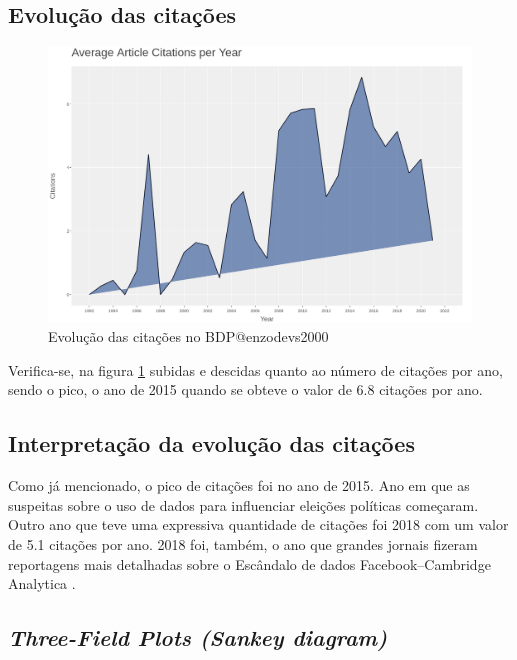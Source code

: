 \subsection{Evolução das citações}

\begin{figure}[H]
    \centering
    \includegraphics[width=1\textwidth]{experiments/enzodevs2000/AnaliseBibliometrica/BigDataInPolicy/Figures/Graficos/citations-evolution.png}
    \caption{Evolução das citações no \dataset BDP@enzodevs2000}
    \label{fig:enzodevs2000:BDP:evol_citation}
\end{figure}

Verifica-se, na figura \ref{fig:enzodevs2000:BDP:evol_citation} subidas e descidas quanto ao número de citações por ano, sendo o pico, o ano de 2015 quando se obteve o valor de 6.8 citações por ano.

\subsection{Interpretação da evolução das citações}

Como já mencionado, o pico de citações foi no ano de 2015. Ano em que as suspeitas sobre o uso de dados para influenciar eleições políticas começaram. Outro ano que teve uma expressiva quantidade de citações foi 2018 com um valor de 5.1 citações por ano. 2018 foi, também, o ano que grandes jornais fizeram reportagens mais detalhadas sobre o Escândalo de dados Facebook–Cambridge Analytica \citep{wikipedia_escandalo_nodate}.

\subsection{\textit{Three-Field Plots (Sankey diagram)}}

